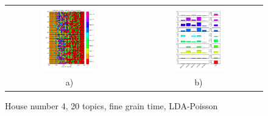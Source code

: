 \begin{figure}[h!]
 \centering
 \begin{tabular}{c c}
  \includegraphics[width=0.45\textwidth]{Pictures/Pois/fine/DayHN4TS48k20fine.png}
  &
  \includegraphics[width=0.45\textwidth]{Pictures/Pois/fine/TopHN4TS48k20fine.png}\\
  a) & b)
 \end{tabular}
  \caption{House number 4, 20 topics, fine grain time, LDA-Poisson}
\end{figure}

